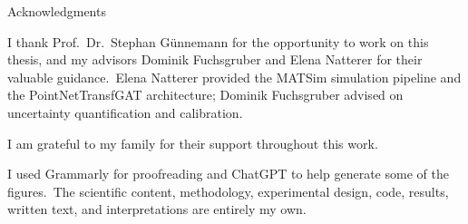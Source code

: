 \thispagestyle{empty}

\vspace*{20mm}

\begin{center}
 { Acknowledgments}
\end{center}

\vspace{10mm}

I thank Prof.\ Dr.\ Stephan G\"unnemann for the opportunity to work on this thesis, and my advisors Dominik Fuchsgruber and Elena Natterer for their valuable guidance.\ Elena Natterer provided the MATSim simulation pipeline and the PointNetTransfGAT architecture; Dominik Fuchsgruber advised on uncertainty quantification and calibration.

\vspace{5mm}

I am grateful to my family for their support throughout this work.

\vspace{5mm}

I used Grammarly for proofreading and ChatGPT to help generate some of the figures.\ The scientific content, methodology, experimental design, code, results, written text, and interpretations are entirely my own.

\cleardoublepage{}
